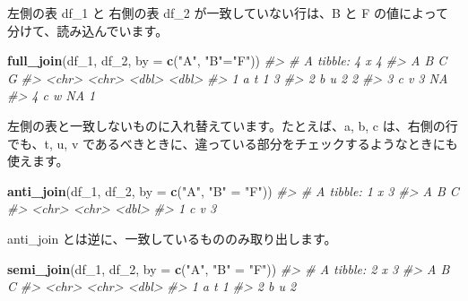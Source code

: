 \documentclass[
  xelatex, ja=standard]{bxjsbook}
\newenvironment{Shaded}{\begin{snugshade}}{\end{snugshade}}
\newcommand{\AttributeTok}[1]{\textcolor[rgb]{0.13,0.29,0.53}{#1}}
\newcommand{\CommentTok}[1]{\textcolor[rgb]{0.56,0.35,0.01}{\textit{#1}}}
\newcommand{\FunctionTok}[1]{\textcolor[rgb]{0.13,0.29,0.53}{\textbf{#1}}}
\newcommand{\NormalTok}[1]{#1}
\newcommand{\OtherTok}[1]{\textcolor[rgb]{0.56,0.35,0.01}{#1}}
\newcommand{\StringTok}[1]{\textcolor[rgb]{0.31,0.60,0.02}{#1}}
\theoremstyle{definition}
\theoremstyle{definition}
\theoremstyle{definition}
\theoremstyle{definition}
\theoremstyle{remark}
\begin{document}
左側の表 df\_1 と 右側の表 df\_2 が一致していない行は、B と F の値によって分けて、読み込んでいます。

\begin{Shaded}
\begin{Highlighting}[]
\FunctionTok{full\_join}\NormalTok{(df\_1, df\_2, }\AttributeTok{by =} \FunctionTok{c}\NormalTok{(}\StringTok{"A"}\NormalTok{, }\StringTok{"B"}\OtherTok{=}\StringTok{"F"}\NormalTok{))}
\CommentTok{\#\textgreater{} \# A tibble: 4 x 4}
\CommentTok{\#\textgreater{}   A     B         C     G}
\CommentTok{\#\textgreater{}   \textless{}chr\textgreater{} \textless{}chr\textgreater{} \textless{}dbl\textgreater{} \textless{}dbl\textgreater{}}
\CommentTok{\#\textgreater{} 1 a     t         1     3}
\CommentTok{\#\textgreater{} 2 b     u         2     2}
\CommentTok{\#\textgreater{} 3 c     v         3    NA}
\CommentTok{\#\textgreater{} 4 c     w        NA     1}
\end{Highlighting}
\end{Shaded}

左側の表と一致しないものに入れ替えています。たとえば、a, b, c は、右側の行でも、t, u, v であるべきときに、違っている部分をチェックするようなときにも使えます。

\begin{Shaded}
\begin{Highlighting}[]
\FunctionTok{anti\_join}\NormalTok{(df\_1, df\_2, }\AttributeTok{by =} \FunctionTok{c}\NormalTok{(}\StringTok{"A"}\NormalTok{, }\StringTok{"B"} \OtherTok{=} \StringTok{"F"}\NormalTok{))}
\CommentTok{\#\textgreater{} \# A tibble: 1 x 3}
\CommentTok{\#\textgreater{}   A     B         C}
\CommentTok{\#\textgreater{}   \textless{}chr\textgreater{} \textless{}chr\textgreater{} \textless{}dbl\textgreater{}}
\CommentTok{\#\textgreater{} 1 c     v         3}
\end{Highlighting}
\end{Shaded}

anti\_join とは逆に、一致しているもののみ取り出します。

\begin{Shaded}
\begin{Highlighting}[]
\FunctionTok{semi\_join}\NormalTok{(df\_1, df\_2, }\AttributeTok{by =} \FunctionTok{c}\NormalTok{(}\StringTok{"A"}\NormalTok{, }\StringTok{"B"} \OtherTok{=} \StringTok{"F"}\NormalTok{))}
\CommentTok{\#\textgreater{} \# A tibble: 2 x 3}
\CommentTok{\#\textgreater{}   A     B         C}
\CommentTok{\#\textgreater{}   \textless{}chr\textgreater{} \textless{}chr\textgreater{} \textless{}dbl\textgreater{}}
\CommentTok{\#\textgreater{} 1 a     t         1}
\CommentTok{\#\textgreater{} 2 b     u         2}
\end{Highlighting}
\end{Shaded}
\end{document}

